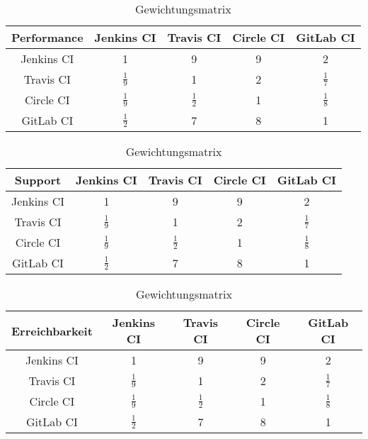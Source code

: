 \begin{table}[h!]
	\centering
	\begin{tabular}{c|cccc}
		Performance   & Jenkins CI		 & Travis CI& Circle CI & GitLab CI   \\ 
		\hline
		Jenkins CI      & 1     		      &        9        &      9       &      2     \\
		Travis CI &   $\frac{1}{9}$     & 1               &  2&$\frac{1}{7}$      \\
		Circle CI   &   $\frac{1}{9}$     &  $\frac{1}{2}$   & 1            & $\frac{1}{8}$  \\
		GitLab CI    &    $\frac{1}{2}$    &  7   &        8      & 1           \\
	\end{tabular}
	\caption{Gewichtungsmatrix}
\end{table}

\begin{table}[h!]
	\centering
	\begin{tabular}{c|cccc}
		Support   & Jenkins CI		 & Travis CI& Circle CI & GitLab CI   \\ 
		\hline
		Jenkins CI      & 1     		      &        9        &      9       &      2     \\
		Travis CI &   $\frac{1}{9}$     & 1               &  2&$\frac{1}{7}$      \\
		Circle CI   &   $\frac{1}{9}$     &  $\frac{1}{2}$   & 1            & $\frac{1}{8}$  \\
		GitLab CI    &    $\frac{1}{2}$    &  7   &        8      & 1           \\
	\end{tabular}
	\caption{Gewichtungsmatrix}
\end{table}

\begin{table}[h!]
	\centering
	\begin{tabular}{c|cccc}
		Erreichbarkeit   & Jenkins CI		 & Travis CI& Circle CI & GitLab CI   \\ 
		\hline
		Jenkins CI      & 1     		      &        9        &      9       &      2     \\
		Travis CI &   $\frac{1}{9}$     & 1               &  2&$\frac{1}{7}$      \\
		Circle CI   &   $\frac{1}{9}$     &  $\frac{1}{2}$   & 1            & $\frac{1}{8}$  \\
		GitLab CI    &    $\frac{1}{2}$    &  7   &        8      & 1           \\
	\end{tabular}
	\caption{Gewichtungsmatrix}
\end{table}

